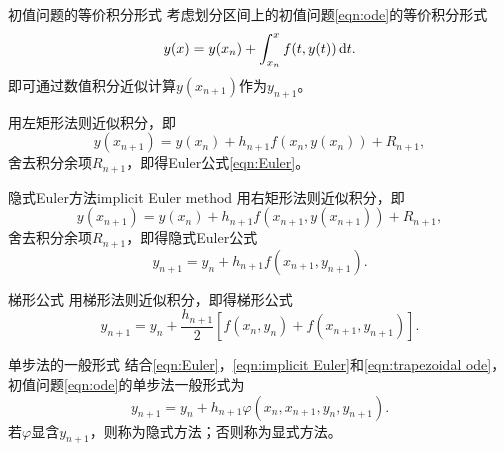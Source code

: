 \begin{theorem}
    {初值问题的等价积分形式}{}
    考虑划分区间上的初值问题\eqref{eqn:ode}的等价积分形式
    \begin{equation}\label{eq:na-ode-integral-equation}
        y(x) = y(x_n) + \int_{x_n}^xf(t,y(t))\mathop{}\!\mathrm{d} t.
    \end{equation}
    即可通过数值积分近似计算$y(x_{n+1})$作为$y_{n+1}$。
\end{theorem}

\begin{corollary}
    用左矩形法则近似积分，即
    \[
        y(x_{n+1}) = y(x_n) + h_{n+1}f(x_n,y(x_n)) + R_{n+1},
    \]
    舍去积分余项$R_{n+1}$，即得Euler公式\eqref{eqn:Euler}。
\end{corollary}

\begin{example}
    {隐式Euler方法}{implicit Euler method}
    用右矩形法则近似积分，即
    \[
        y(x_{n+1}) = y(x_n) + h_{n+1}f(x_{n+1},y(x_{n+1})) + R_{n+1},
    \]
    舍去积分余项$R_{n+1}$，即得隐式Euler公式
    \begin{equation}
        \label{eqn:implicit Euler}
        y_{n+1} = y_n + h_{n+1}f(x_{n+1},y_{n+1}).
    \end{equation}
\end{example}

\begin{example}
    {梯形公式}{}
    用梯形法则近似积分，即得梯形公式
    \begin{equation}
        \label{eqn:trapezoidal ode}
        y_{n+1} = y_n + \frac{h_{n+1}}2[f(x_n,y_n) + f(x_{n+1},y_{n+1})].
    \end{equation}
\end{example}

\begin{definition}
    {单步法的一般形式}{}
    结合\eqref{eqn:Euler}，\eqref{eqn:implicit Euler}和\eqref{eqn:trapezoidal ode}，初值问题\eqref{eqn:ode}的单步法一般形式为
    \begin{equation}\label{eq:na-one-step-method}
        y_{n+1} = y_n + h_{n+1}\varphi(x_n,x_{n+1},y_n,y_{n+1}).
    \end{equation}
    若$\varphi$显含$y_{n+1}$，则称为隐式方法；否则称为显式方法。
\end{definition}

